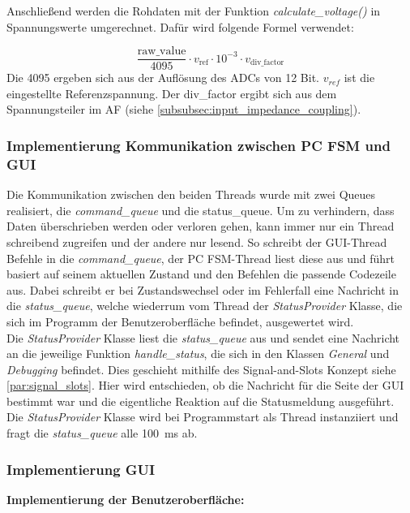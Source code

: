 \documentclass[a4paper, portrait, 12pt]{scrartcl} %
\begin{document}
Anschließend werden die Rohdaten mit der Funktion \emph{calculate\_voltage()} in Spannungswerte umgerechnet. Dafür wird folgende Formel verwendet:

$$
\frac{\text{raw\_value}}{4095} \cdot v_{\text{ref}} \cdot 10^{-3} \cdot v_{\text{div\_factor}}
$$
{\footnotesize Die 4095 ergeben sich aus der Auflösung des ADCs von 12 Bit. $v_{ref}$ ist die eingestellte Referenzspannung. Der div\_factor ergibt sich aus dem Spannungsteiler im AF (siehe \autoref{subsubsec:input_impedance_coupling}).}

\subsubsection{Implementierung Kommunikation zwischen PC FSM und GUI}
Die Kommunikation zwischen den beiden Threads wurde mit zwei Queues realisiert, die \emph{command\_queue} und die {status\_queue}. Um zu verhindern, dass Daten überschrieben werden oder verloren gehen, kann immer nur ein Thread schreibend zugreifen und der andere nur lesend. So schreibt der GUI-Thread Befehle in die \emph{command\_queue}, der PC FSM-Thread liest diese aus und führt basiert auf seinem aktuellen Zustand und den Befehlen die passende Codezeile aus. Dabei schreibt er bei Zustandswechsel oder im Fehlerfall eine Nachricht in die  \emph{status\_queue}, welche wiederrum vom Thread der \emph{StatusProvider} Klasse, die sich im Programm der Benutzeroberfläche befindet, ausgewertet wird.\\ 

Die \emph{StatusProvider} Klasse liest die \emph{status\_queue} aus und sendet eine Nachricht an die jeweilige Funktion \emph{handle\_status}, die sich in den Klassen \emph{General} und \emph{Debugging} befindet. Dies geschieht mithilfe des Signal-and-Slots Konzept siehe \autoref{par:signal_slots}. Hier wird entschieden, ob die Nachricht für die Seite der GUI bestimmt war und die eigentliche Reaktion auf die Statusmeldung ausgeführt.\\

Die \emph{StatusProvider} Klasse wird bei Programmstart als Thread instanziiert und fragt die \emph{status\_queue} alle 100~ms ab.
\pagebreak
\subsubsection{Implementierung GUI}

\textbf{Implementierung der Benutzeroberfläche:}\\
\end{document}
